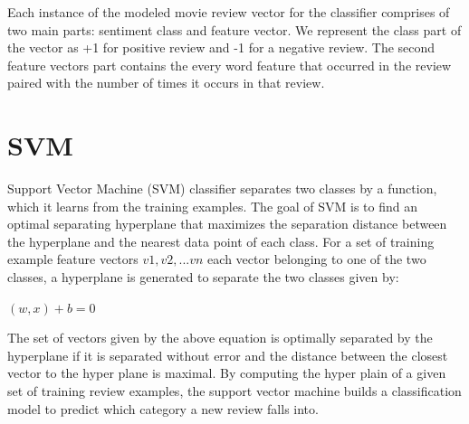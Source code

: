 \documentclass[conference]{IEEEtran}
\begin{document}
Each instance of the modeled movie review vector for the classifier comprises of two main parts:
sentiment class and feature vector. We represent the class part of the vector as +1 for positive review
and -1 for a negative review. The second feature vectors part contains the every word feature that
occurred in the review paired with the number of times it occurs in that review.


\section{SVM}

Support Vector Machine (SVM) classifier separates two classes by a function, which it learns
from the training examples. The goal of SVM is to find an optimal separating hyperplane that
maximizes the separation distance between the hyperplane and the nearest data point of each class. For
a set of training example feature vectors ${v1, v2, ... vn }$ each vector belonging to one of the two
classes, a hyperplane is generated to separate the two classes given by:

$(w, x) + b = 0$

The set of vectors given by the above equation is optimally separated by the hyperplane if it is
separated without error and the distance between the closest vector to the hyper plane is maximal.
By computing the hyper plain of a given set of training review examples, the support vector machine
builds a classification model to predict which category a new review falls into.



\end{document}
